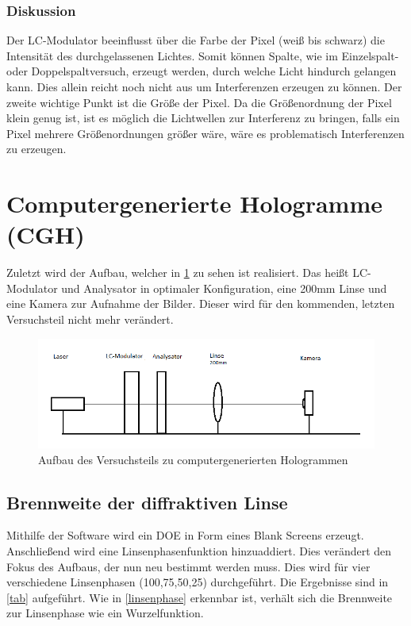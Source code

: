 \subsubsection{Diskussion}
Der LC-Modulator beeinflusst über die Farbe der Pixel (weiß bis schwarz) die Intensität des durchgelassenen Lichtes. Somit können Spalte, wie im Einzelspalt- oder Doppelspaltversuch, erzeugt werden, durch welche Licht hindurch gelangen kann. Dies allein reicht noch nicht aus um Interferenzen erzeugen zu können. Der zweite wichtige Punkt ist die Größe der Pixel. Da die Größenordnung der Pixel klein genug ist, ist es möglich die Lichtwellen zur Interferenz zu bringen, falls ein Pixel mehrere Größenordnungen größer wäre, wäre es problematisch Interferenzen zu erzeugen.

\section{Computergenerierte Hologramme (CGH)}
Zuletzt wird der Aufbau, welcher in \cref{cghskizze} zu sehen ist realisiert. Das heißt LC-Modulator und Analysator in optimaler Konfiguration, eine 200mm Linse und eine Kamera zur Aufnahme der Bilder. Dieser wird für den kommenden, letzten Versuchsteil nicht mehr verändert.

\begin{figure}
	\centering
	\includegraphics[scale=0.8]{cgh_skizze.png}
	\caption{Aufbau des Versuchsteils zu computergenerierten Hologrammen}
	\label{cghskizze}
\end{figure}

\subsection{Brennweite der diffraktiven Linse}
Mithilfe der Software wird ein DOE in Form eines Blank Screens erzeugt. Anschließend wird eine Linsenphasenfunktion hinzuaddiert. Dies verändert den Fokus des Aufbaus, der nun neu bestimmt werden muss. Dies wird für vier verschiedene Linsenphasen (100,75,50,25) durchgeführt. Die Ergebnisse sind in \cref{tab} aufgeführt. Wie in \cref{linsenphase} erkennbar ist, verhält sich die Brennweite zur Linsenphase wie ein Wurzelfunktion.


